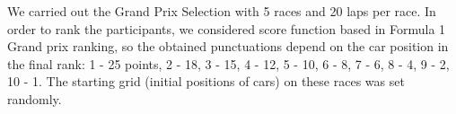 \documentclass[10pt,journal,compsoc]{IEEEtran}
\begin{document}
We carried out the Grand Prix Selection with 5 races and 20 laps per race. In order to rank the participants, we considered score function based in Formula 1 Grand prix ranking, so the obtained punctuations depend on the car position in the final rank: 1 - 25 points, 2 - 18, 3 - 15, 4 - 12, 5 - 10, 6 - 8, 7 - 6, 8 - 4, 9 - 2, 10 - 1. The starting grid (initial positions of cars) on these races was set randomly.\\
                           
%                           
%	
%	
%
%
%
%
%         
%          
%
\end{document}
